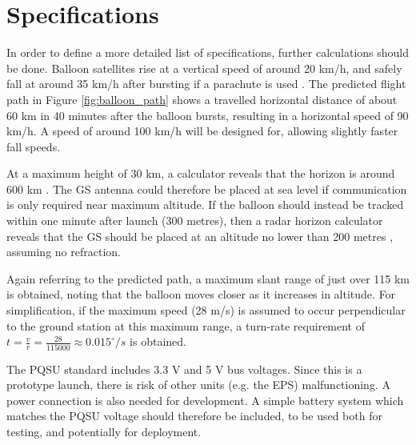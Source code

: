 \graphicspath{{./figures}}

\section{Specifications}

In order to define a more detailed list of specifications, further calculations should be done. Balloon satellites rise at a vertical speed of around 20 km/h, and safely fall at around 35 km/h after bursting if a parachute is used \cite{site-weatherWeatherBalloons}. The predicted flight path in Figure \ref{fig:balloon_path} shows a travelled horizontal distance of about 60 km in 40 minutes after the balloon bursts, resulting in a horizontal speed of 90 km/h. A speed of around 100 km/h will be designed for, allowing slightly faster fall speeds.

At a maximum height of 30 km, a calculator reveals that the horizon is around 600 km \cite{site-normalHorizon}. The GS antenna could therefore be placed at sea level if communication is only required near maximum altitude. If the balloon should instead be tracked within one minute after launch (300 metres), then a radar horizon calculator reveals that the GS should be placed at an altitude no lower than 200 metres \cite{site-radarHorizon}, assuming no refraction.

Again referring to the predicted path, a maximum slant range of just over 115 km is obtained, noting that the balloon moves closer as it increases in altitude. For simplification, if the maximum speed (28 m/s) is assumed to occur perpendicular to the ground station at this maximum range, a turn-rate requirement of $t = \frac{v}{r} = \frac{28}{115000} \approx 0.015^\circ / s$ is obtained.

The PQSU standard includes 3.3 V and 5 V bus voltages. Since this is a prototype launch, there is risk of other units (e.g. the EPS) malfunctioning. A power connection is also needed for development. A simple battery system which matches the PQSU voltage should therefore be included, to be used both for testing, and potentially for deployment.

